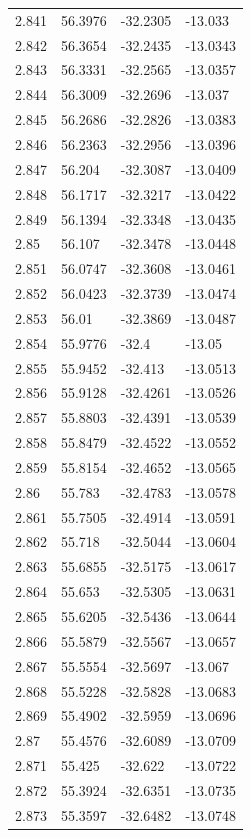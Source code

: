 \begin{tabular}{llll}
2.841 & 56.3976 & -32.2305 & -13.033 \\
2.842 & 56.3654 & -32.2435 & -13.0343 \\
2.843 & 56.3331 & -32.2565 & -13.0357 \\
2.844 & 56.3009 & -32.2696 & -13.037 \\
2.845 & 56.2686 & -32.2826 & -13.0383 \\
2.846 & 56.2363 & -32.2956 & -13.0396 \\
2.847 & 56.204 & -32.3087 & -13.0409 \\
2.848 & 56.1717 & -32.3217 & -13.0422 \\
2.849 & 56.1394 & -32.3348 & -13.0435 \\
2.85 & 56.107 & -32.3478 & -13.0448 \\
2.851 & 56.0747 & -32.3608 & -13.0461 \\
2.852 & 56.0423 & -32.3739 & -13.0474 \\
2.853 & 56.01 & -32.3869 & -13.0487 \\
2.854 & 55.9776 & -32.4 & -13.05 \\
2.855 & 55.9452 & -32.413 & -13.0513 \\
2.856 & 55.9128 & -32.4261 & -13.0526 \\
2.857 & 55.8803 & -32.4391 & -13.0539 \\
2.858 & 55.8479 & -32.4522 & -13.0552 \\
2.859 & 55.8154 & -32.4652 & -13.0565 \\
2.86 & 55.783 & -32.4783 & -13.0578 \\
2.861 & 55.7505 & -32.4914 & -13.0591 \\
2.862 & 55.718 & -32.5044 & -13.0604 \\
2.863 & 55.6855 & -32.5175 & -13.0617 \\
2.864 & 55.653 & -32.5305 & -13.0631 \\
2.865 & 55.6205 & -32.5436 & -13.0644 \\
2.866 & 55.5879 & -32.5567 & -13.0657 \\
2.867 & 55.5554 & -32.5697 & -13.067 \\
2.868 & 55.5228 & -32.5828 & -13.0683 \\
2.869 & 55.4902 & -32.5959 & -13.0696 \\
2.87 & 55.4576 & -32.6089 & -13.0709 \\
2.871 & 55.425 & -32.622 & -13.0722 \\
2.872 & 55.3924 & -32.6351 & -13.0735 \\
2.873 & 55.3597 & -32.6482 & -13.0748 \\

\end{tabular}
